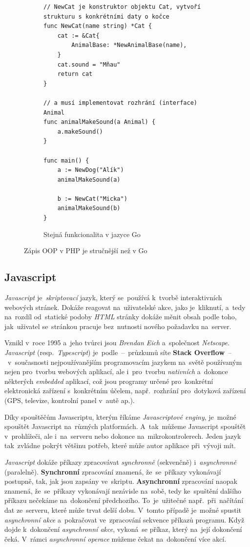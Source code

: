 \documentclass[10pt,a4paper]{article}
\begin{document}
\begin{figure}
\begin{subfigure}[b]{0.45\linewidth}
\begin{verbatim}
// NewCat je konstruktor objektu Cat, vytvoří strukturu s konkrétními daty o kočce
func NewCat(name string) *Cat {
	cat := &Cat{
		AnimalBase: *NewAnimalBase(name),
	}
	cat.sound = "Mňau"
	return cat
}

// a musí implementovat rozhrání (interface) Animal
func animalMakeSound(a Animal) {
    a.makeSound()
}

func main() {
	a := NewDog("Alík")
	animalMakeSound(a)

	b := NewCat("Micka")
	animalMakeSound(b)
}
                \end{verbatim}
                \caption{Stejná funkcionalita v jazyce Go}
            \end{subfigure}
            \caption{Zápis OOP v PHP je stručnější než v Go}
            \label{oop:difference}
        \end{figure}

        \subsection{Javascript}
        \emph{Javascript} je~\emph{skriptovací} jazyk, který se~používá k~tvorbě interaktivních webových stránek. Dokáže reagovat na~uživatelské akce, jako je~kliknutí, a~tedy na~rozdíl od~statické podoby \emph{HTML} stránky dokáže měnit obsah podle toho, jak~uživatel se~stránkou pracuje bez~nutnosti nového požadavku na~server.

        Vznikl v~roce 1995 a~jeho tvůrci jsou \emph{Brendan Eich} a~společnost \emph{Netscape}. \emph{Javascript} (resp.~\emph{Typescript}) je~podle~--~průzkumů síte \textbf{Stack Overflow}~--~v~současnosti nejpoužívanějším programovacím jazykem na~světě používaným nejen pro~tvorbu webových aplikací, ale i~pro~tvorbu \emph{nativních} a~dokonce některých \emph{embedded} aplikací, což jsou programy určené pro~konkrétní elektronická zařízení s~konkrétním účelem, např.~rozhrání pro~dotyková zařízení (GPS, televize, kontrolní panel v~autě ap.).

        Díky spouštěčům Javascriptu, kterým říkáme \emph{Javascriptové enginy}, je~možné spouštět Javascript na~různých platformách. A~tak~můžeme Javascript spouštět v~prohlížeči, ale i~na~serveru nebo dokonce na~mikrokontrolerech. Jeden jazyk tak~zvládne pokrýt většinu potřeb, které může autor aplikace při~vývoji mít.

        \emph{Javascript} dokáže příkazy zpracovávat \emph{synchronně} (sekvenčně) i~\emph{asynchronně} (paralelně). \textbf{Synchronní} zpracování znamená, že~se~příkazy vykonávají postupně, tak, jak jsou zapsány ve~skriptu. \textbf{Asynchronní} zpracování naopak znamená, že~se~příkazy vykonávají nezávisle na~sobě, tedy ke~spuštění dalšího příkazu nečekáme na~dokončení předchozího. To~je~užitečné např.~při~načítání dat ze~serveru, které může trvat delší dobu. V~tomto případě je~možné spustit \emph{asynchronní akce} a~pokračovat ve~zpracování sekvence příkazů programu. Když dojde k~dokončení \emph{asynchronní akce}, vykoná~se příkaz, který na~její dokončení čeká. V~rámci \emph{asynchronní operace} můžeme čekat na~dokončení více akcí. \cite{kantor_javascript}
\end{document}
